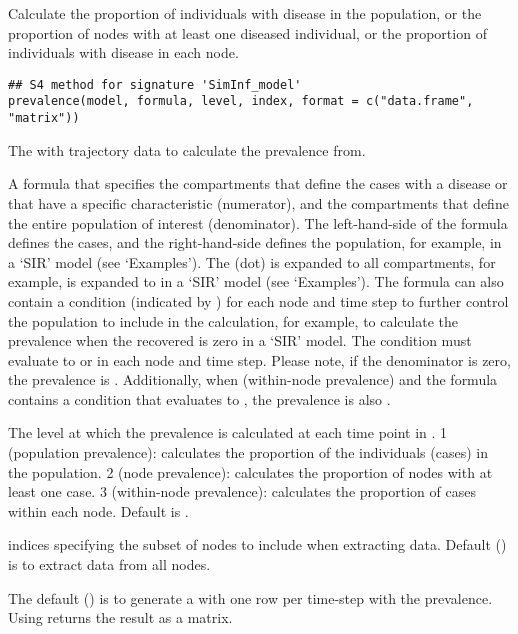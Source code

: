 \documentclass[letterpaper]{book}
\begin{document}
%
\begin{Description}
Calculate the proportion of individuals with disease in the
population, or the proportion of nodes with at least one diseased
individual, or the proportion of individuals with disease in each
node.
\end{Description}
%
\begin{Usage}
\begin{verbatim}
## S4 method for signature 'SimInf_model'
prevalence(model, formula, level, index, format = c("data.frame", "matrix"))
\end{verbatim}
\end{Usage}
%
\begin{Arguments}
\begin{ldescription}
\item[\code{model}] The  with trajectory data to calculate
the prevalence from.

\item[\code{formula}] A formula that specifies the compartments that
define the cases with a disease or that have a specific
characteristic (numerator), and the compartments that define
the entire population of interest (denominator). The
left-hand-side of the formula defines the cases, and the
right-hand-side defines the population, for example,
 in a `SIR' model (see
`Examples'). The   (dot) is expanded to all
compartments, for example,   is expanded to
 in a `SIR' model (see
`Examples'). The formula can also contain a condition
(indicated by \code{|}) for each node and time step to further
control the population to include in the calculation, for
example,  to calculate the prevalence
when the recovered is zero in a `SIR' model. The
condition must evaluate to  or  in each
node and time step. Please note, if the denominator is zero,
the prevalence is . Additionally, when
 (within-node prevalence) and the formula
contains a condition that evaluates to , the
prevalence is also .

\item[\code{level}] The level at which the prevalence is calculated at
each time point in . 1 (population prevalence):
calculates the proportion of the individuals (cases) in the
population. 2 (node prevalence): calculates the proportion of
nodes with at least one case. 3 (within-node prevalence):
calculates the proportion of cases within each node. Default
is .

\item[\code{index}] indices specifying the subset of nodes to include
when extracting data. Default () is to
extract data from all nodes.

\item[\code{format}] The default () is to
generate a  with one row per time-step with
the prevalence. Using  returns the
result as a matrix.
\end{ldescription}
\end{Arguments}
\end{document}
